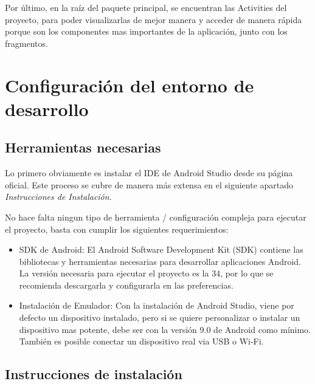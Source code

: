 \documentclass{article}
\begin{document}
Por último, en la raíz del paquete principal, se encuentran las Activities del proyecto, para poder visualizarlas de mejor manera y acceder de manera rápida porque son los componentes mas importantes de la aplicación, junto con los fragmentos.

\section{Configuración del entorno de desarrollo}

    \subsection{Herramientas necesarias}
    
    Lo primero obviamente es instalar el IDE de Android Studio desde su página oficial. Este proceso se cubre de manera más extensa en el siguiente apartado \textit{Instrucciones de Instalación}.
    
    No hace falta ningun tipo de herramienta / configuración compleja para ejecutar el proyecto, basta con cumplir los siguientes requerimientos:
    
    \begin{itemize}
        \item SDK de Android: El Android Software Development Kit (SDK) contiene las bibliotecas y herramientas necesarias para desarrollar aplicaciones Android. La versión necesaria para ejecutar el proyecto es la 34, por lo que se recomienda descargarla  y configurarla en las preferencias.
        \item Instalación de Emulador: Con la instalación de Android Studio, viene por defecto un dispositivo instalado, pero si se quiere personalizar o instalar un dispositivo mas potente, debe ser con la versión 9.0 de Android como mínimo. También es posible conectar un dispositivo real via USB o Wi-Fi.
    \end{itemize}
    
    \subsection{Instrucciones de instalación}
    
\end{document}
